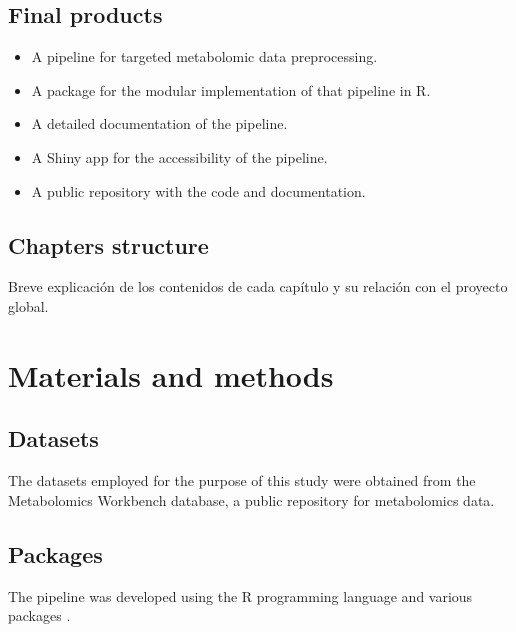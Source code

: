 \documentclass[ENG, BIB]{TFUOC}%
\begin{document}
\section{Final products} 
\begin{itemize}
    \item A pipeline for targeted metabolomic data preprocessing.
    \item A package for the modular implementation of that pipeline in R.
    \item A detailed documentation of the pipeline.
    \item A Shiny app for the accessibility of the pipeline.
    \item A public repository with the code and documentation.
\end{itemize}

\section{Chapters structure} 
Breve explicación de los contenidos de cada capítulo y su relación con el proyecto global.




\chapter{Materials and methods}

\section{Datasets}
The datasets employed for the purpose of this study were obtained from the Metabolomics Workbench database, a public repository for metabolomics data. 

\section{Packages}
The pipeline was developed using the R programming language and various packages .
\end{document}

